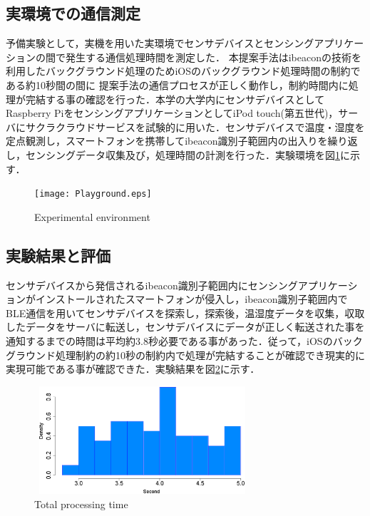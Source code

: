 \documentclass[submit,techrep]{ipsj}
\begin{document}
\subsection{実環境での通信測定}
予備実験として，実機を用いた実環境でセンサデバイスとセンシングアプリケーションの間で発生する通信処理時間を測定した．
本提案手法はibeaconの技術を利用したバックグラウンド処理のためiOSのバックグラウンド処理時間の制約である約10秒間の間に
提案手法の通信プロセスが正しく動作し，制約時間内に処理が完結する事の確認を行った．本学の大学内にセンサデバイスとしてRaspberry PiをセンシングアプリケーションとしてiPod touch(第五世代)，サーバにサクラクラウドサービスを試験的に用いた．センサデバイスで温度・湿度を定点観測し，スマートフォンを携帯してibeacon識別子範囲内の出入りを繰り返し，センシングデータ収集及び，処理時間の計測を行った．実験環境を図\ref{Experimental}に示す．


\begin{figure}[t]
 \begin{center}
  \texttt{[image: Playground.eps]}
 \end{center}
 \caption{Experimental environment}
 \label{Experimental}
\end{figure}

\subsection{実験結果と評価}
センサデバイスから発信されるibeacon識別子範囲内にセンシングアプリケーションがインストールされたスマートフォンが侵入し，ibeacon識別子範囲内でBLE通信を用いてセンサデバイスを探索し，探索後，温湿度データを収集，収取したデータをサーバに転送し，センサデバイスにデータが正しく転送された事を通知するまでの時間は平均約3.8秒必要である事があった．従って，iOSのバックグラウンド処理制約の約10秒の制約内で処理が完結することが確認でき現実的に実現可能である事が確認できた．実験結果を図\ref{TimeT}に示す．


\begin{figure}[t]
 \begin{center}
  \includegraphics[keepaspectratio, width=80mm,height=40mm]{TotalTime.eps}
 \end{center}
 \caption{Total processing time}
 \label{TimeT}
\end{figure}
\end{document}
